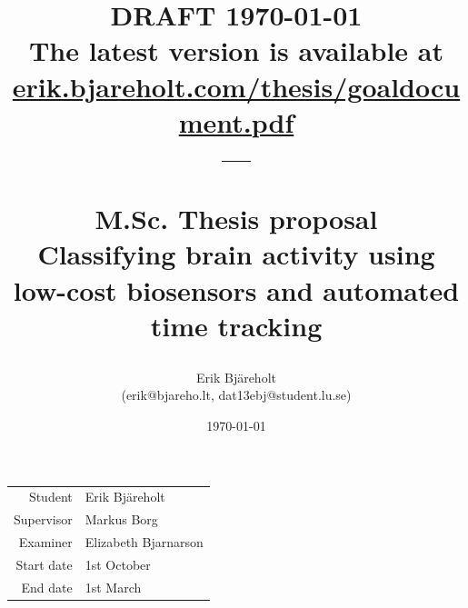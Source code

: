 \documentclass{IEEEtran}
\title{%
    \small DRAFT \today \\
    \small The latest version is available at \href{https://erik.bjareholt.com/thesis/goaldocument.pdf}{erik.bjareholt.com/thesis/goaldocument.pdf}\\
    \large --- \\
    \large \par M.Sc. Thesis proposal\\
    \huge Classifying brain activity using low-cost biosensors and automated time tracking \\
}
\author{Erik Bjäreholt \\(erik@bjareho.lt, dat13ebj@student.lu.se)}
\date{\today}
\begin{document}
\maketitle

\begin{center}
\begin{tabular}{r l}
 Student & Erik Bjäreholt \\
 Supervisor & Markus Borg \\
 Examiner & Elizabeth Bjarnarson \\
 Start date & 1st October \\
 End date & 1st March \\
\end{tabular}
\end{center}

\setlength{\parskip}{0em}
\tableofcontents
\setlength{\parskip}{1em}

\end{document}
